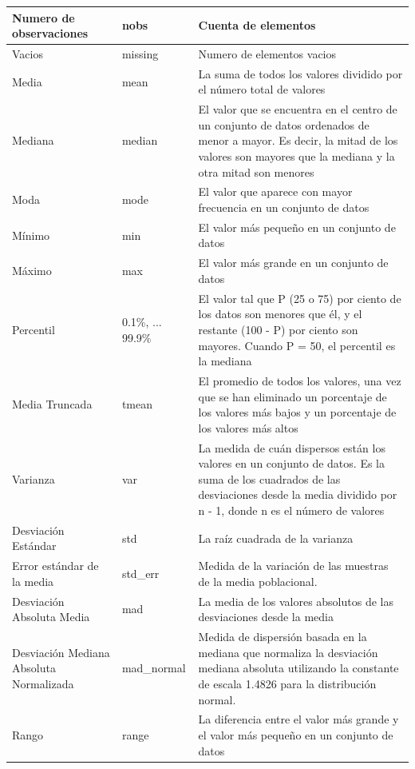 \begin{longtable}{|m{7em}|m{5em}|m{20em}|}
    \hline \hline
    \endlastfoot
    \hline
    Numero de observaciones & nobs & Cuenta de elementos \\
    \hline
    Vacios & missing & Numero de elementos vacios \\
    \hline
    Media & mean & La suma de todos los valores dividido por el número total de valores \\
    \hline
    Mediana & median & El valor que se encuentra en el centro de un conjunto de datos ordenados de menor a mayor. Es decir, la mitad de los valores son mayores que la mediana y la otra mitad son menores \\
    \hline
    Moda & mode & El valor que aparece con mayor frecuencia en un conjunto de datos \\
    \hline
    Mínimo & min & El valor más pequeño en un conjunto de datos \\
    \hline
    Máximo & max & El valor más grande en un conjunto de datos \\
    \hline
    Percentil & 0.1\%, ... 99.9\% & El valor tal que P (25 o 75) por ciento de los datos son menores que él, y el restante (100 - P) por ciento son mayores. Cuando P = 50, el percentil es la mediana \\
    \hline
    Media Truncada & tmean & El promedio de todos los valores, una vez que se han eliminado un porcentaje de los valores más bajos y un porcentaje de los valores más altos \\
    \hline
    Varianza & var & La medida de cuán dispersos están los valores en un conjunto de datos. Es la suma de los cuadrados de las desviaciones desde la media dividido por n - 1, donde n es el número de valores \\
    \hline
    Desviación Estándar & std & La raíz cuadrada de la varianza \\
    \hline
    Error estándar de la media & std\_err & Medida de la variación de las muestras de la media poblacional. \\
    \hline
    Desviación Absoluta Media & mad & La media de los valores absolutos de las desviaciones desde la media \\
    \hline
    Desviación Mediana Absoluta Normalizada & mad\_normal & Medida de dispersión basada en la mediana que normaliza la desviación mediana absoluta utilizando la constante de escala 1.4826 para la distribución normal. \\
    \hline
    Rango & range & La diferencia entre el valor más grande y el valor más pequeño en un conjunto de datos \\

\end{longtable}
